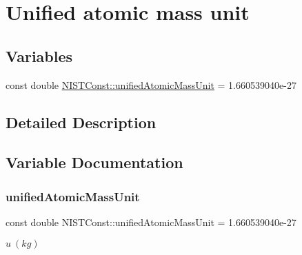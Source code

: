 \hypertarget{group___unified_atomic_mass_unit}{}\section{Unified atomic mass unit}
\label{group___unified_atomic_mass_unit}
\subsection*{Variables}
\begin{DoxyCompactItemize}
\item 
const double \hyperlink{group___unified_atomic_mass_unit_ga5dbf5ee7e0ef084434d647e917855f39}{N\+I\+S\+T\+Const\+::unified\+Atomic\+Mass\+Unit} = 1.\+660539040e-\/27
\end{DoxyCompactItemize}


\subsection{Detailed Description}


\subsection{Variable Documentation}
\mbox{\label{group___unified_atomic_mass_unit_ga5dbf5ee7e0ef084434d647e917855f39}} 
\subsubsection{\texorpdfstring{unified\+Atomic\+Mass\+Unit}{unifiedAtomicMassUnit}}
{\footnotesize\ttfamily const double N\+I\+S\+T\+Const\+::unified\+Atomic\+Mass\+Unit = 1.\+660539040e-\/27}

$u \ (kg)$ 
